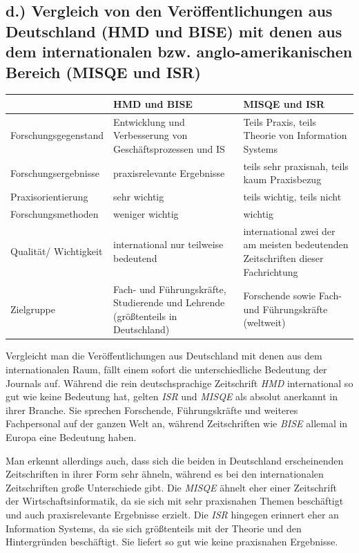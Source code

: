 \documentclass[12pt,utf8]{scrartcl}
\begin{document}
\begin{flushleft}
\subsection*{\label{sub4:einfuehrung}d.) Vergleich von den Veröffentlichungen aus Deutschland (HMD und BISE) mit denen aus dem internationalen bzw. anglo-amerikanischen Bereich (MISQE und ISR)}

\begin{tabular}{|p{4cm}|p{5.5cm}|p{5.5cm}|}
\hline
& HMD und BISE & MISQE und ISR \\
\hline
Forschungsgegenstand & Entwicklung und Verbesserung von Geschäftsprozessen und IS & Teils Praxis, teils Theorie von Information Systems \\
\hline
Forschungsergebnisse & praxisrelevante Ergebnisse & teils sehr praxisnah, teils kaum Praxisbezug \\
\hline
Praxisorientierung & sehr wichtig & teils wichtig, teils nicht \\
\hline
Forschungsmethoden & weniger wichtig & wichtig \\
\hline
Qualität/ Wichtigkeit & international nur teilweise bedeutend & international zwei der am meisten bedeutenden Zeitschriften dieser Fachrichtung \\
\hline
Zielgruppe & Fach- und Führungskräfte, Studierende und Lehrende (größtenteils in Deutschland) & Forschende sowie Fach- und Führungskräfte (weltweit) \\
\hline
\end{tabular}
\newline
\newline
\newline

Vergleicht man die Veröffentlichungen aus Deutschland mit denen aus dem internationalen Raum, fällt einem sofort die unterschiedliche Bedeutung der Journals auf. Während die rein deutschsprachige Zeitschrift \emph{HMD} international so gut wie keine Bedeutung hat, gelten \emph{ISR} und \emph{MISQE} als absolut anerkannt in ihrer Branche. Sie sprechen Forschende, Führungskräfte und weiteres Fachpersonal auf der ganzen Welt an, während Zeitschriften wie \emph{BISE} allemal in Europa eine Bedeutung haben\cite{VHBJ}. 

Man erkennt allerdings auch, dass sich die beiden in Deutschland erscheinenden Zeitschriften in ihrer Form sehr ähneln, während es bei den internationalen Zeitschriften große Unterschiede gibt. Die \emph{MISQE} ähnelt eher einer Zeitschrift der Wirtschaftsinformatik, da sie  sich mit sehr praxisnahen Themen beschäftigt und auch praxisrelevante Ergebnisse erzielt. Die \emph{ISR} hingegen erinnert eher an Information Systems, da sie sich größtenteils mit der Theorie und den Hintergründen beschäftigt. Sie liefert so gut wie keine praxisnahen Ergebnisse. 
\newline


\end{flushleft}
\end{document}
